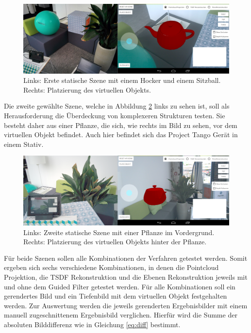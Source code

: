 \begin{figure}[h]
  \centering
	\includegraphics[width=1.0\textwidth]{content/images/evaluation/static-scene.png} 
  \caption{Links: Erste statische Szene mit einem Hocker und einem Sitzball. Rechts: Platzierung des virtuellen Objekts. }
  \label{fig:static-scene}
\end{figure}

Die zweite gewählte Szene, welche in Abbildung \ref{fig:plant-scene} links zu sehen ist, soll als Herausforderung die Überdeckung von komplexeren Strukturen testen. Sie besteht daher aus einer Pflanze, die sich, wie rechts im Bild zu sehen, vor dem virtuellen Objekt befindet. Auch hier befindet sich das Project Tango Gerät in einem Stativ.

\begin{figure}[h]
  \centering
	\includegraphics[width=1.0\textwidth]{content/images/evaluation/plant-scene.png} 
  \caption{Links: Zweite statische Szene mit einer Pflanze im Vordergrund. Rechts: Platzierung des virtuellen Objekts hinter der Pflanze. }
  \label{fig:plant-scene}
\end{figure}

Für beide Szenen sollen alle Kombinationen der Verfahren getestet werden. Somit ergeben sich sechs verschiedene Kombinationen, in denen die Pointcloud Projektion, die TSDF Rekonstruktion und die Ebenen Rekonstruktion jeweils mit und ohne dem Guided Filter getestet werden. Für alle Kombinationen soll ein gerendertes Bild und ein Tiefenbild mit dem virtuellen Objekt festgehalten werden. Zur Auswertung werden die jeweils gerenderten Ergebnisbilder mit einem manuell zugeschnittenem Ergebnisbild verglichen. Hierfür wird die Summe der absoluten Bilddifferenz wie in Gleichung \ref{eq:diff} bestimmt.

